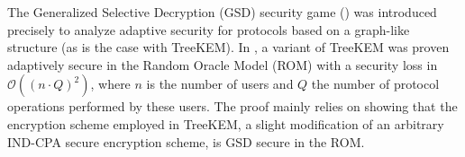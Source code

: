 The Generalized Selective Decryption (GSD) security game (\cite{gsd}) was introduced precisely to analyze adaptive security for protocols based on a graph-like structure (as is the case with TreeKEM). In \cite{ttkem}, a variant of TreeKEM was proven adaptively secure in the Random Oracle Model (ROM) with a security loss in $\mathcal{O}((n \cdot Q)^2)$, where $n$ is the number of users and $Q$ the number of protocol operations performed by these users. The proof mainly relies on showing that the encryption scheme employed in TreeKEM, a slight modification of an arbitrary IND-CPA secure encryption scheme, is GSD secure in the ROM.

